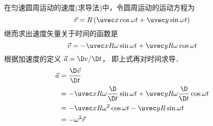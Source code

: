 

在匀速圆周运动的速度(求导法)中，令圆周运动的运动方程为
\begin{equation}
\vec r = R\left( {\uvec x\cos \omega t + \uvec y\sin\omega t} \right)
\end{equation}
继而求出速度矢量关于时间的函数是
\begin{equation}
\vec v =  - \uvec xR\omega \sin \omega t + \uvec yR\omega \cos \omega t
\end{equation} 
根据加速度的定义 $\vec a = \D v/\D t$， 即上式再对时间求导．
\begin{equation}\begin{split}
\vec a &= \frac{\D\vec v}{\D t} \\
&=  - \uvec x R\omega \frac{\D}{\D t} \sin \omega t + \uvec yR\omega \frac{\D}{\D t}\cos \omega t\\
&=  - \uvec xR{\omega ^2}\cos \omega t - \uvec yR \sin \omega t\\
&=  - {\omega ^2}\vec r
\end{split}\end{equation} 









